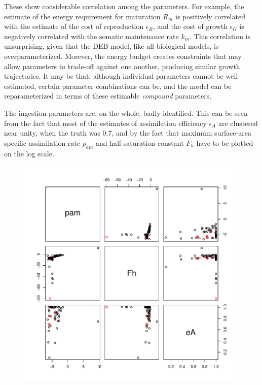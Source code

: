 \documentclass[12pt,reqno,final]{amsart}
\theoremstyle{plain}
\numberwithin{equation}{part}
\begin{document}
These show considerable correlation among the parameters. For example,
the estimate of the energy requirement for maturation $\bar{R_m}$ is
positively correlated with the estimate of the cost of
reproduction $\epsilon_R$, and the cost of growth $\epsilon_G$ is
negatively correlated with the somatic maintenance rate $k_m$. This
correlation is unsurprising, given that the DEB model, like
all biological models, is overparameterized. Morever, the energy
budget creates constraints that may allow parameters to trade-off
against one another, producing similar growth trajectories. It may be
that, although individual parameters cannot be well-estimated, certain
parameter combinations can be, and the model can be reparameterized in
terms of these estimable \emph{compound} parameters.

The ingestion parameters are, on the whole, badly identified. This can
be seen from the fact that most of the estimates of assimilation
efficiency $\epsilon_A$ are clustered near unity, when the truth was
0.7, and by the fact that maximum surface-area specific assimilation
rate $p_{am}$ and half-saturation constant $F_h$ have to be plotted on
the log scale.

\begin{figure}
\includegraphics{Solving_the_problem_of_parameter_covariation-002}
\end{figure}
\end{document}
